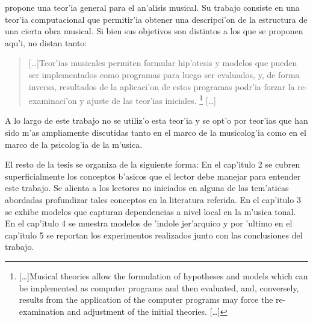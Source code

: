%

\cite{Cambouropoulos98} propone una teor'ia general para el an'alisis musical. 
Su trabajo consiste en una teor'ia computacional que permitir'ia obtener una descripci'on de la estructura de una cierta obra musical. Si bien sus 
objetivos son distintos a los que se proponen aqu'i, no distan tanto: 
\begin{quote}
[\ldots]Teor'ias musicales permiten formular hip'otesis y modelos que pueden ser implementados
como programas para luego ser evaluados, y, de forma inversa, resultados de la aplicaci'on de
estos programas podr'ia forzar la re-examinaci'on y ajuste de las teor'ias iniciales. \footnote{[\ldots]Musical theories allow the formulation of hypotheses and models which can be implemented
as computer programs and then evaluated, and, conversely, results from the application of the
computer programs may force the re-examination and adjustment of the initial theories. [\ldots]
} [\ldots]

\end{quote} 
A lo largo de este trabajo no se utiliz'o esta teor'ia y se opt'o por teor'ias que han sido m'as ampliamente discutidas tanto en el marco de la musicolog'ia
como en el marco de la psicolog'ia de la m'usica.

%
%

El resto de la tesis se organiza de la siguiente forma: En el cap'itulo 2 se cubren superficialmente los conceptos b'asicos que el lector debe manejar para entender
este trabajo. Se alienta a los lectores no iniciados en alguna de las tem'aticas abordadas profundizar tales conceptos en la literatura referida. 
En el cap'itulo 3 se exhibe modelos que capturan dependencias a nivel local en la m'usica tonal. 
En el cap'itulo 4 se muestra modelos de 'indole jer'arquico y por 'ultimo en el cap'itulo 5 se reportan los experimentos realizados junto con 
las conclusiones del trabajo.
